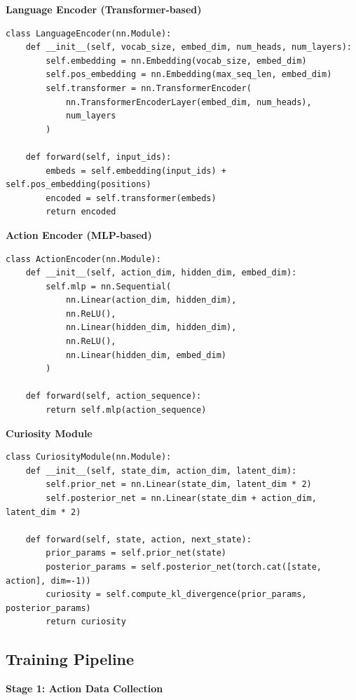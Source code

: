 \documentclass{IEEEtran}
\begin{document}
\textbf{Language Encoder (Transformer-based)}

\begin{verbatim}
class LanguageEncoder(nn.Module):
    def __init__(self, vocab_size, embed_dim, num_heads, num_layers):
        self.embedding = nn.Embedding(vocab_size, embed_dim)
        self.pos_embedding = nn.Embedding(max_seq_len, embed_dim)
        self.transformer = nn.TransformerEncoder(
            nn.TransformerEncoderLayer(embed_dim, num_heads),
            num_layers
        )
    
    def forward(self, input_ids):
        embeds = self.embedding(input_ids) + self.pos_embedding(positions)
        encoded = self.transformer(embeds)
        return encoded
\end{verbatim}

\textbf{Action Encoder (MLP-based)}

\begin{verbatim}
class ActionEncoder(nn.Module):
    def __init__(self, action_dim, hidden_dim, embed_dim):
        self.mlp = nn.Sequential(
            nn.Linear(action_dim, hidden_dim),
            nn.ReLU(),
            nn.Linear(hidden_dim, hidden_dim),
            nn.ReLU(),
            nn.Linear(hidden_dim, embed_dim)
        )
    
    def forward(self, action_sequence):
        return self.mlp(action_sequence)
\end{verbatim}

\textbf{Curiosity Module}

\begin{verbatim}
class CuriosityModule(nn.Module):
    def __init__(self, state_dim, action_dim, latent_dim):
        self.prior_net = nn.Linear(state_dim, latent_dim * 2)
        self.posterior_net = nn.Linear(state_dim + action_dim, latent_dim * 2)
    
    def forward(self, state, action, next_state):
        prior_params = self.prior_net(state)
        posterior_params = self.posterior_net(torch.cat([state, action], dim=-1))
        curiosity = self.compute_kl_divergence(prior_params, posterior_params)
        return curiosity
\end{verbatim}

\subsection{Training Pipeline}

\textbf{Stage 1: Action Data Collection}
\end{document}
